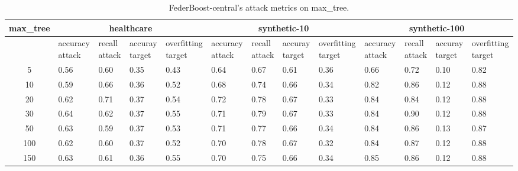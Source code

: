 \begin{table*}[]\centering
\begin{tabular}{|c| *{12}{m{1.0cm}|}}
\hline\rowcolor{gray!50}
\cellcolor{gray!80} max_tree & \multicolumn{4}{c|}{healthcare} & \multicolumn{4}{c|}{synthetic-10} & \multicolumn{4}{c|}{synthetic-100}\\\hline 
& accuracy attack & recall attack & accuray target & overfitting target & accuracy attack & recall attack & accuray target & overfitting target & accuracy attack & recall attack & accuray target & overfitting target\\\hline
5 & 0.56 & 0.60 & 0.35 & 0.43 & 0.64 & 0.67 & 0.61 & 0.36 & 0.66 & 0.72 & 0.10 & 0.82\\ \hline
10 & 0.59 & 0.66 & 0.36 & 0.52 & 0.68 & 0.74 & 0.66 & 0.34 & 0.82 & 0.86 & 0.12 & 0.88\\ \hline
20 & 0.62 & 0.71 & 0.37 & 0.54 & 0.72 & 0.78 & 0.67 & 0.33 & 0.84 & 0.84 & 0.12 & 0.88\\ \hline
30 & 0.64 & 0.62 & 0.37 & 0.55 & 0.71 & 0.79 & 0.67 & 0.33 & 0.84 & 0.90 & 0.12 & 0.88\\ \hline
50 & 0.63 & 0.59 & 0.37 & 0.53 & 0.71 & 0.77 & 0.66 & 0.34 & 0.84 & 0.86 & 0.13 & 0.87\\ \hline
100 & 0.62 & 0.60 & 0.37 & 0.52 & 0.70 & 0.78 & 0.67 & 0.32 & 0.84 & 0.87 & 0.12 & 0.88\\ \hline
150 & 0.63 & 0.61 & 0.36 & 0.55 & 0.70 & 0.75 & 0.66 & 0.34 & 0.85 & 0.86 & 0.12 & 0.88\\ \hline
\end{tabular} 
\caption{FederBoost-central's attack metrics on max_tree.}
\label{tab:experiment1_max_tree}
\end{table*}
